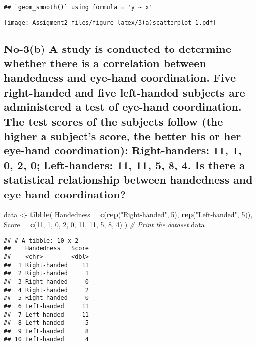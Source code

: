 \documentclass[
]{article}
\newenvironment{Shaded}{\begin{snugshade}}{\end{snugshade}}
\newcommand{\AttributeTok}[1]{\textcolor[rgb]{0.13,0.29,0.53}{#1}}
\newcommand{\CommentTok}[1]{\textcolor[rgb]{0.56,0.35,0.01}{\textit{#1}}}
\newcommand{\DecValTok}[1]{\textcolor[rgb]{0.00,0.00,0.81}{#1}}
\newcommand{\FunctionTok}[1]{\textcolor[rgb]{0.13,0.29,0.53}{\textbf{#1}}}
\newcommand{\NormalTok}[1]{#1}
\newcommand{\OtherTok}[1]{\textcolor[rgb]{0.56,0.35,0.01}{#1}}
\newcommand{\StringTok}[1]{\textcolor[rgb]{0.31,0.60,0.02}{#1}}
\begin{document}
\begin{verbatim}
## `geom_smooth()` using formula = 'y ~ x'
\end{verbatim}

\texttt{[image: Assigment2\_files/figure-latex/3(a)scatterplot-1.pdf]}

\subsection{No-3(b) A study is conducted to determine whether there is a
correlation between handedness and eye-hand coordination. Five
right-handed and five left-handed subjects are administered a test of
eye-hand coordination. The test scores of the subjects follow (the
higher a subject's score, the better his or her eye-hand coordination):
Right-handers: 11, 1, 0, 2, 0; Left-handers: 11, 11, 5, 8, 4. Is there a
statistical relationship between handedness and eye hand
coordination?}\label{no-3b-a-study-is-conducted-to-determine-whether-there-is-a-correlation-between-handedness-and-eye-hand-coordination.-five-right-handed-and-five-left-handed-subjects-are-administered-a-test-of-eye-hand-coordination.-the-test-scores-of-the-subjects-follow-the-higher-a-subjects-score-the-better-his-or-her-eye-hand-coordination-right-handers-11-1-0-2-0-left-handers-11-11-5-8-4.-is-there-a-statistical-relationship-between-handedness-and-eye-hand-coordination}

\begin{Shaded}
\begin{Highlighting}[]
\NormalTok{data }\OtherTok{\textless{}{-}} \FunctionTok{tibble}\NormalTok{(}
  \AttributeTok{Handedness =} \FunctionTok{c}\NormalTok{(}\FunctionTok{rep}\NormalTok{(}\StringTok{"Right{-}handed"}\NormalTok{, }\DecValTok{5}\NormalTok{), }\FunctionTok{rep}\NormalTok{(}\StringTok{"Left{-}handed"}\NormalTok{, }\DecValTok{5}\NormalTok{)),}
  \AttributeTok{Score =} \FunctionTok{c}\NormalTok{(}\DecValTok{11}\NormalTok{, }\DecValTok{1}\NormalTok{, }\DecValTok{0}\NormalTok{, }\DecValTok{2}\NormalTok{, }\DecValTok{0}\NormalTok{, }\DecValTok{11}\NormalTok{, }\DecValTok{11}\NormalTok{, }\DecValTok{5}\NormalTok{, }\DecValTok{8}\NormalTok{, }\DecValTok{4}\NormalTok{)}
\NormalTok{)}
\CommentTok{\# Print the dataset}
\NormalTok{data}
\end{Highlighting}
\end{Shaded}

\begin{verbatim}
## # A tibble: 10 x 2
##    Handedness   Score
##    <chr>        <dbl>
##  1 Right-handed    11
##  2 Right-handed     1
##  3 Right-handed     0
##  4 Right-handed     2
##  5 Right-handed     0
##  6 Left-handed     11
##  7 Left-handed     11
##  8 Left-handed      5
##  9 Left-handed      8
## 10 Left-handed      4
\end{verbatim}
\end{document}
